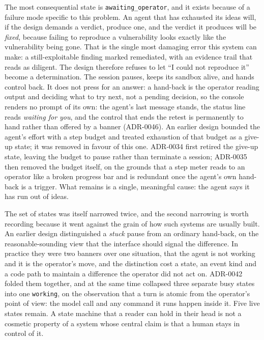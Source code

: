 The most consequential state is \texttt{awaiting\_operator}, and it exists because
of a failure mode specific to this problem. An agent that has exhausted its ideas
will, if the design demands a verdict, produce one, and the verdict it
produces will be \emph{fixed}, because failing to reproduce a vulnerability looks
exactly like the vulnerability being gone. That is the single most damaging error
this system can make: a still-exploitable finding marked remediated, with an
evidence trail that reads as diligent. The design therefore refuses to let
``I could not reproduce it'' become a determination. The session pauses, keeps
its sandbox alive, and hands control back. It does not press for an answer: a
hand-back is the operator reading output and deciding what to try next, not a
pending decision, so the console renders no prompt of its own: the agent's
last message stands, the status line reads \emph{waiting for you}, and the
control that ends the retest is permanently to hand rather than offered by a
banner (ADR-0046). An
earlier design bounded the agent's effort with a step budget and treated
exhaustion of that budget as a give-up state; it was removed in favour of this
one. ADR-0034 first retired the give-up state, leaving the budget to pause rather
than terminate a session; ADR-0035 then removed the budget itself, on the grounds
that a step meter reads to an operator like a broken progress bar and is redundant
once the agent's own hand-back is a trigger. What remains is a single, meaningful
cause: the agent says it has run out of ideas.

The set of states was itself narrowed twice, and the second narrowing is worth
recording because it went against the grain of how such systems are usually built.
An earlier design distinguished a \emph{stuck} pause from an ordinary hand-back,
on the reasonable-sounding view that the interface should signal the difference.
In practice they were two banners over one situation, that the agent is not working
and it is the operator's move, and the distinction cost a state, an event kind
and a code path to maintain a difference the operator did not act on. ADR-0042
folded them together, and at the same time collapsed three separate busy states
into one \texttt{working}, on the observation that a turn is atomic from the
operator's point of view: the model call and any command it runs happen inside it.
Five live states remain. A state machine that a reader can hold in their head is
not a cosmetic property of a system whose central claim is that a human stays in
control of it.

